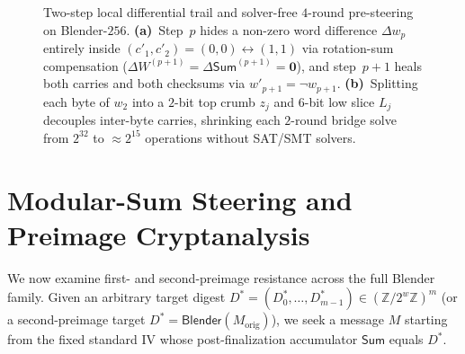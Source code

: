 \documentclass[11pt,a4paper]{article}
\theoremstyle{definition}
\theoremstyle{remark}
\newcommand{\Zmod}[1]{\mathbb{Z}/2^{#1}\mathbb{Z}}
\newcommand{\SumAcc}{\mathsf{Sum}}
\begin{document}
\begin{figure}[t!]
\caption{Two-step local differential trail and solver-free $4$-round pre-steering on Blender-$256$. \textbf{(a)}~Step~$p$ hides a non-zero word difference $\Delta w_p$ entirely inside $(c'_1, c'_2) = (0,0) \leftrightarrow (1,1)$ via rotation-sum compensation ($\Delta W^{(p+1)} = \Delta\SumAcc^{(p+1)} = \mathbf{0}$), and step~$p+1$ heals both carries and both checksums via $w'_{p+1} = \neg w_{p+1}$. \textbf{(b)}~Splitting each byte of $w_2$ into a $2$-bit top crumb $z_j$ and $6$-bit low slice $L_j$ decouples inter-byte carries, shrinking each $2$-round bridge solve from $2^{32}$ to $\approx 2^{15}$ operations without SAT/SMT solvers.}
\label{fig:route2-healing}
\end{figure}

\section{Modular-Sum Steering and Preimage Cryptanalysis}
\label{sec:dsos}

We now examine first- and second-preimage resistance across the full Blender family. Given an arbitrary target digest $D^* = (D^*_0, \dots, D^*_{m-1}) \in (\Zmod{w})^m$ (or a second-preimage target $D^* = \mathsf{Blender}(M_{\mathrm{orig}})$), we seek a message $M$ starting from the fixed standard IV whose post-finalization accumulator $\SumAcc$ equals $D^*$.
\end{document}
